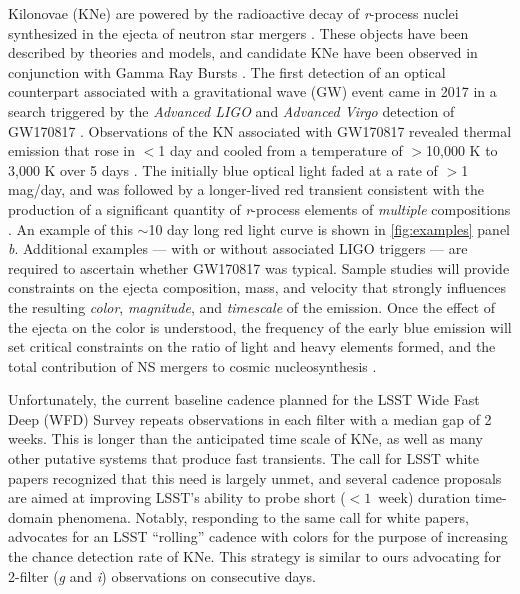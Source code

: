 \documentclass[letterpaper,longauthor,trackchanges,twocolumn,onecolappendix,sort&compress]{aastex62}
\begin{document}
Kilonovae (KNe) are powered by the radioactive decay of \emph{r}-process nuclei synthesized in the ejecta of neutron star mergers \citep{Li1998,MetzgerKN}.  These objects have been described by theories and models, and candidate KNe have been observed in conjunction with Gamma Ray Bursts \citep{Tanvir13, Berger13, Jin15}. The first detection of an optical counterpart associated with a gravitational wave (GW) event came in 2017 in a search triggered by the \emph{Advanced LIGO} \citep{Aasi15} and \emph{Advanced Virgo} \citep{Acernese15} detection of 
GW170817 \citep{Abbott2017}. Observations of the KN associated with GW170817 revealed thermal emission that rose in $<$1 day and cooled from a temperature of $>$10,000 K to 3,000 K over 5 days \citep{Drout2017}. The initially blue optical light faded at a rate of $>$1 mag/day, and was followed by a longer-lived red transient consistent with the production of a significant quantity of \emph{r}-process elements of \emph{multiple} compositions \citep[][and references therein]{Cowp+17,Drout2017,Villar2017,Tanvir2017,Smartt2017,Kasliwal2017}. An example of this $\sim$10 day long red light curve is shown in \autoref{fig:examples} panel \emph{b}. Additional examples --- with or without associated LIGO triggers --- are required to ascertain whether GW170817 was typical. Sample studies will provide constraints on the ejecta composition, mass, and velocity that strongly influences the resulting \emph{color}, \emph{magnitude}, and \emph{timescale} of the emission. Once the effect of the ejecta on the color is understood, the frequency of the early blue emission will set critical constraints on the ratio of light and heavy elements formed, and the total contribution of NS mergers to cosmic nucleosynthesis \citep{Rosswog2018,Piro2018,Metzger2018}.

Unfortunately, the current baseline cadence planned for the LSST Wide Fast Deep (WFD) Survey repeats observations in each filter with a median gap of 2 weeks. This is longer than the anticipated time scale of KNe, as well as many other putative systems that produce fast transients. The call for LSST white papers recognized that this need is largely unmet, and several cadence proposals are aimed at improving LSST's ability to probe short ($< 1$~week) duration time-domain phenomena. Notably, responding to the same call for white papers, \citet{Andreoni2018} advocates for an LSST ``rolling'' cadence with colors for the purpose of increasing the chance detection rate of KNe. This strategy is similar to ours advocating for 2-filter (\emph{g} and \emph{i}) observations on consecutive days. 
\end{document}
